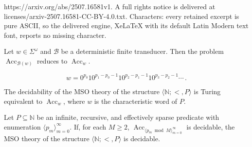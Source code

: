 \documentclass[10pt,a4paper]{amsart}
\newcommand{\Acc} {\operatorname{Acc}}
\newcommand{\nat} {\mathbb{N}}
\begin{document}
https://arxiv.org/abs/2507.16581v1. A full rights notice is delivered at licenses/arxiv-2507.16581-CC-BY-4.0.txt. Characters: every retained excerpt is pure ASCII, so the delivered engine, XeLaTeX with its default Latin Modern text font, reports no missing character.
\begin{lemma}\label{thm : transducer reduction}
Let $w \in \Sigma^\omega$ and $\mathcal{B}$ be a deterministic finite transducer. Then the problem $\Acc_{\mathcal{B}(w)}$ reduces to $\Acc_{w}$.
\end{lemma} 

\begin{equation}\label{eq : characteristic word P}
    w = 0^{p_0}10^{p_1 - p_0-1}10^{p_2 - p_1-1}10^{p_3 - p_2-1} \cdots \, .
\end{equation}

\begin{theorem}\label{thm : Buchi MSO char word}
    The decidability of the MSO theory of the structure $\langle \nat ; < , P \rangle$ is Turing equivalent to $\Acc_w$, where $w$ is the characteristic word of $P$.
\end{theorem}

\begin{proposition}\label{prop : reduction one unary predicate} 
Let $P \subseteq \nat$ be an infinite, recursive, and effectively
sparse predicate with enumeration $\langle p_m\rangle_{m=0}^\infty$.
If, for each $M \ge 2$, $\Acc_{\langle p_m\bmod M\rangle_{m=0}^\infty}$ is decidable, the MSO theory of the structure $\langle \nat; <, P \rangle$ is decidable.
\end{proposition}
\end{document}
